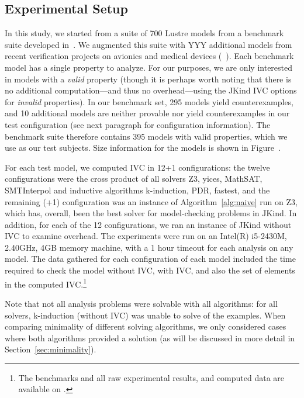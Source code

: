 \subsection{Experimental Setup}
In this study, we started from a suite of 700 Lustre models from a benchmark suite developed in~\cite{Hagen08:FMCAD}.  We augmented this suite with YYY additional models from recent verification projects on avionics and medical devices (~\cite{QFCS15:backes,hilt2013}).  
Each benchmark model has a single property to analyze.  For our purposes, we are only interested in models with a {\em valid} property (though it is perhaps worth noting that there is no additional computation---and thus no overhead---using the JKind IVC options for {\em invalid} properties).  In our benchmark set, 295 models yield counterexamples, and 10 additional models are neither provable nor yield counterexamples in our test configuration (see next paragraph for configuration information).  The benchmark suite therefore contains 395 models with valid properties, which we use as our test subjects.  Size information for the models is shown in Figure~.

For each test model, we computed IVC in 12+1 configurations: the twelve configurations were the cross product of all solvers {Z3, yices, MathSAT, SMTInterpol} and inductive algorithms {k-induction, PDR, fastest}, and the remaining (+1) configuration was an instance of Algorithm~\ref{alg:naive} run on Z3, which has, overall, been the best solver for model-checking problems in JKind.  In addition, for each of the 12 configurations, we ran an instance of JKind without IVC to examine overhead.  The experiments were run on an Intel(R) i5-2430M, 2.40GHz, 4GB memory machine, with a 1 hour timeout for each analysis on any model.  The data gathered for each configuration of each model included the time required to check the model without IVC, with IVC, and also the set of elements in the computed IVC.\footnote{The benchmarks and all raw experimental results, and computed data are available on \cite{expr}.}  

Note that not all analysis problems were solvable with all algorithms: for all solvers, k-induction (without IVC) was unable to solve  of the examples.  When comparing minimality of different solving algorithms, we only considered cases where both algorithms provided a solution (as will be discussed in more detail in Section~\ref{sec:minimality}).

